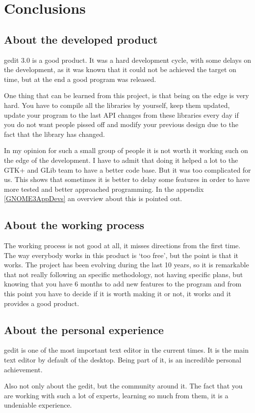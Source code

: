 
\chapter{Conclusions}

\section{About the developed product}

gedit 3.0 is a good product. It was a hard development cycle, with some delays on the development, as it was known that it could not be achieved the  target on time, but at the end a good program was released.

One thing that can be learned from this project, is that being on the edge is very hard. You have to compile all the libraries by yourself, keep them updated, update your program to the last API changes from these libraries every day if you do not want people pissed off and modify your previous design due to the fact that the library has changed.

In my opinion for such a small group of people it is not worth it working such on the edge of the development. I have to admit that doing it helped a lot to the GTK+ and GLib team to have a better code base. But it was too complicated for us. This shows that sometimes it is better to delay some features in order to have more tested and better approached programming. In the appendix \ref{GNOME3AppDevs} an overview about this is pointed out.

\section{About the working process}

The working process is not good at all, it misses directions from the first time. The way everybody works in this product is `too free', but the point is that it works. The project has been evolving during the last 10 years, so it is remarkable that not really following an specific methodology, not having specific plans, but knowing that you have 6 months to add new features to the program and from this point you have to decide if it is worth making it or not, it works and it provides a good product.

\newpage
\section{About the personal experience}

gedit is one of the most important text editor in the current times. It is the main text editor by default of the \GNOME desktop. Being part of it, is an incredible personal achievement.

Also not only about the gedit, but the community around it. The fact that you are working with such a lot of experts, learning so much from them, it is a undeniable experience.
